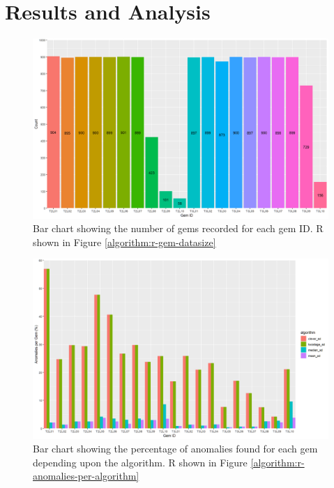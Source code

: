 \documentclass[journal]{IEEEtran}
\begin{document}
\section{Results and Analysis}
\begin{figure}[t]
    \centering
    \includegraphics[width=12cm]{graph-gem-datasize.png}
    \caption{Bar chart showing the number of gems recorded for each gem ID. R shown in Figure \ref{algorithm:r-gem-datasize}}
    \label{graph:gem-datasize}
\end{figure}

\begin{figure}[b]
    \centering
    \includegraphics[width=12cm]{graph-anomalies-per-algorithm.png}
    \caption{Bar chart showing the percentage of anomalies found for each gem depending upon the algorithm. R shown in Figure \ref{algorithm:r-anomalies-per-algorithm}}
    \label{graph:anomalies-per-algorithm}
\end{figure}
\end{document}
